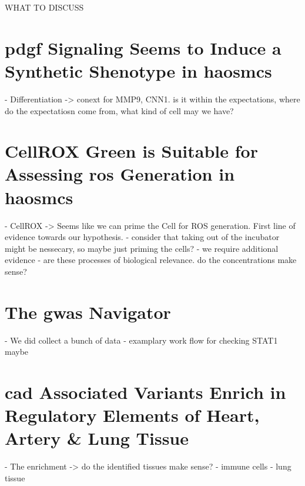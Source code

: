 WHAT TO DISCUSS
\section{\ac{pdgf} Signaling Seems to Induce a Synthetic Shenotype in \acp{haosmc}}
- Differentiation -> conext for MMP9, CNN1. is it within the expectations, where do the expectatiosn come from, what kind of cell may we have?

\section{CellROX Green is Suitable for Assessing \ac{ros} Generation in \acp{haosmc}}

- CellROX -> Seems like we can prime the Cell for ROS generation. First line of evidence towards our hypothesis.
    - consider that taking out of the incubator might be nessecary, so maybe just priming the cells?
    - we require additional evidence
    - are these processes of biological relevance. do the concentrations make sense?

\section{The \ac{gwas} Navigator}
- We did collect a bunch of data
    - examplary work flow for checking STAT1 maybe


\section{\ac{cad} Associated Variants Enrich in Regulatory Elements of Heart, Artery \& Lung Tissue}
    - The enrichment -> do the identified tissues make sense?
        - immune cells
        - lung tissue
